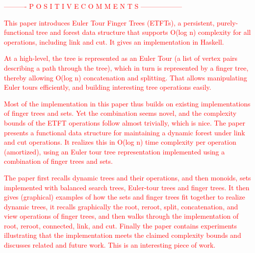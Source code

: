 \documentclass[runningheads,a4paper]{llncs}
\newcommand{\tcr} [1]{\textcolor{red}{#1}}
\begin{document}



\tcr{---------- P O S I T I V E    C O M M E N T S ------------------}


\tcr{This paper introduces Euler Tour Finger Trees (ETFTs), a persistent, purely-functional tree and forest data structure that supports O(log n) complexity for all operations, including link and cut. It gives an implementation in Haskell.}

\tcr{At a high-level, the tree is represented as an Euler Tour (a list of vertex pairs describing a path through the tree), which in turn is represented by a finger tree, thereby allowing O(log n) concatenation and splitting. That allows manipulating Euler tours efficiently, and building interesting tree operations easily.}

\tcr{Most of the implementation in this paper thus builds on existing implementations of finger trees and sets. Yet the combination seems novel, and the complexity bounds of the ETFT operations follow almost trivially, which is nice.
The paper presents a functional data structure for maintaining a dynamic forest under link and cut operations. It realizes this in O(log n) time complexity per operation (amortized), using an Euler tour tree representation implemented using a combination of finger trees and sets. }

\tcr{The paper first recalls dynamic trees and their operations, and then monoids, sets implemented with balanced search trees, Euler-tour trees and finger trees. It then gives (graphical) examples of how the sets and finger trees fit together to realize dynamic trees, it recalls graphically the root, reroot, split, concatenation, and view operations of finger trees, and then walks through the implementation of root, reroot, connected, link, and cut.
Finally the paper contains experiments illustrating that the implementation meets the claimed complexity bounds and discusses related and future work.
This is an interesting piece of work.}




%

 

 

 

 




%
\end{document}
